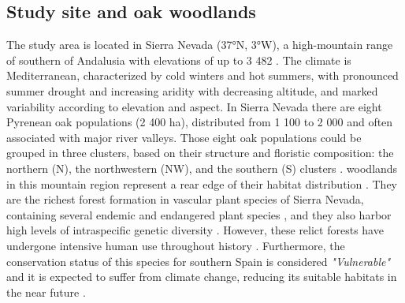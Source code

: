 \subsection{Study site and oak woodlands}\label{sec:carbon:mat-studysite}
The study area is located in Sierra Nevada (37°N, 3°W), a high-mountain range of southern of Andalusia with elevations of up to 3 482 \eleven. The climate is Mediterranean, characterized by cold winters and hot summers, with pronounced summer drought and increasing aridity with decreasing altitude, and marked variability according to elevation and aspect. In Sierra Nevada there are eight Pyrenean oak populations (2 400 ha), distributed from 1 100 to 2 000 \eleven and often associated with major river valleys. Those eight oak populations could be grouped in three clusters, based on their structure and floristic composition: the northern (N), the northwestern (NW), and the southern (S) clusters \autocite[see chapter \ref{sec:multivar}; also][]{PerezLuqueetal2021EcologicalDiversity}. \Qp woodlands in this mountain region represent a rear edge of their habitat distribution \autocite{HampePetit2005ConservingBiodiversity}. They are the richest forest formation in vascular plant species of Sierra Nevada, containing several endemic and endangered plant species \autocite{Loriteetal2008PhytosociologicalReview}, and they also harbor high levels of intraspecific genetic diversity \autocite{ValbuenaCarabanaGil2013GeneticResilience}. However, these relict forests have undergone intensive human use throughout history \autocite{CamachoOlmedoetal2002DinamicaEvolutiva}. Furthermore, the conservation status of this species for southern Spain is considered \emph{"Vulnerable"} and it is expected to suffer from climate change, reducing its suitable habitats in the near future \autocite{GeaIzquierdoetal2013GrowthProjections,GeaIzquierdoetal2017RiskyFuture,Benitoetal2011SimulatingPotential}.

\begin{table}[]
\caption{Allometric equations to compute biomass fraction of \Qp \autocite{RuizPeinadoetal2012BiomassModels}. DBH: Diameter at breast height; h: Tree height.}
\label{tab:carbon:biomasseq}
\end{table}



